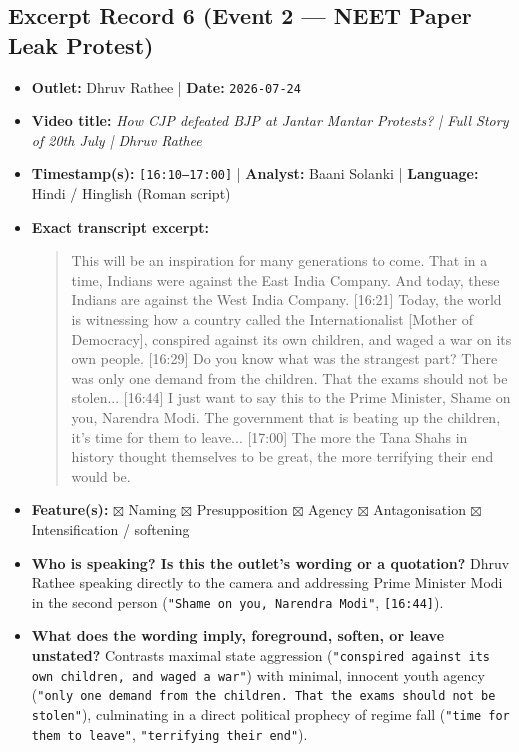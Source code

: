 \documentclass[10pt,a4paper]{article}
\begin{document}
\subsection*{Excerpt Record 6 (Event 2 --- NEET Paper Leak Protest)}
\begin{itemize}[leftmargin=1.5em, itemsep=3pt, topsep=4pt]
  \item \textbf{Outlet:} Dhruv Rathee | \textbf{Date:} \texttt{2026-07-24}
  \item \textbf{Video title:} \textit{How CJP defeated BJP at Jantar Mantar Protests? | Full Story of 20th July | Dhruv Rathee}
  \item \textbf{Timestamp(s):} \texttt{[16:10--17:00]} | \textbf{Analyst:} Baani Solanki | \textbf{Language:} Hindi / Hinglish (Roman script)
  \item \textbf{Exact transcript excerpt:}
    \begin{quote}\small\ttfamily [16:10] This will be an inspiration for many generations to come. That in a time, Indians were against the East India Company. And today, these Indians are against the West India Company. [16:21] Today, the world is witnessing how a country called the Internationalist [Mother of Democracy], conspired against its own children, and waged a war on its own people. [16:29] Do you know what was the strangest part? There was only one demand from the children. That the exams should not be stolen... [16:44] I just want to say this to the Prime Minister, Shame on you, Narendra Modi. The government that is beating up the children, it's time for them to leave... [17:00] The more the Tana Shahs in history thought themselves to be great, the more terrifying their end would be.\end{quote}
  \item \textbf{Feature(s):} $\boxtimes$ Naming $\boxtimes$ Presupposition $\boxtimes$ Agency $\boxtimes$ Antagonisation $\boxtimes$ Intensification / softening
  \item \textbf{Who is speaking? Is this the outlet's wording or a quotation?} Dhruv Rathee speaking directly to the camera and addressing Prime Minister Modi in the second person (\texttt{"Shame on you, Narendra Modi"}, \texttt{[16:44]}).
  \item \textbf{What does the wording imply, foreground, soften, or leave unstated?} Contrasts maximal state aggression (\texttt{"conspired against its own children, and waged a war"}) with minimal, innocent youth agency (\texttt{"only one demand from the children. That the exams should not be stolen"}), culminating in a direct political prophecy of regime fall (\texttt{"time for them to leave"}, \texttt{"terrifying their end"}).

\end{itemize}
\end{document}
